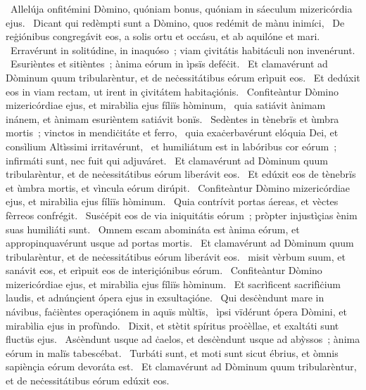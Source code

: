{~Allelúja}
{%
onfitémini Dòmino, quóniam bonus, quóniam in sáeculum mizericórdia ejus.
~Dicant qui redèmpti sunt a Dòmino, quos redémit de mànu inimíci,
~De reġiónibus congregávit eos, a solis ortu et occásu, et ab aquilóne et mari.
~Erravérunt in solitúdine, in inaquóso~; viam çivitátis habitáculi non invenérunt.
~Esurièntes et sitièntes~; ànima eórum in ìpsïs deféċit.
~Et clamavérunt ad Dòminum quum tribularèntur, et de neċessitátibus eórum erìpuit eos.
~Et dedúxit eos in viam rectam, ut irent in çivitátem habitaçiónis.
~Confiteàntur Dòmino mizericórdiae ejus, et mirabìlia ejus fíliïs hòminum,
~quia satiávit ànimam inánem, et ànimam esurièntem satiávit bonïs.
~Sedèntes in tènebrïs et ùmbra mortis~; vinctos in mendiċitáte et ferro,
~quia exaċerbavérunt elóquia Dei, et consìlium Altìssimi irritavérunt,
~et humiliátum est in labóribus cor eórum~; infirmáti sunt, nec fuit qui adjuváret.
~Et clamavérunt ad Dòminum quum tribularèntur, et de neċessitátibus eórum liberávit eos.
~Et edúxit eos de tènebrïs et ùmbra mortis, et vìncula eórum dirúpit.
~Confiteàntur Dòmino mizericórdiae ejus, et mirabìlia ejus fíliïs hòminum.
~Quia contrívit portas áereas, et vèctes fèrreos confrégit.
~Susċépit eos de via iniquitátis eórum~; pròpter injustìçias ènim suas humiliáti sunt.
~Omnem escam abomináta est ànima eórum, et appropinquavérunt usque ad portas mortis.
~Et clamavérunt ad Dòminum quum tribularèntur, et de neċessitátibus eórum liberávit eos.
~misit vèrbum suum, et sanávit eos, et erìpuit eos de interiçiónibus eórum.
~Confiteàntur Dòmino mizericórdiae ejus, et mirabìlia ejus fíliïs hòminum.
~Et sacrìficent sacrifìċium laudis, et adnúnçient ópera ejus in exsultaçióne.
~Qui desċèndunt mare in návibus, faċièntes operaçiónem in aquïs mùltïs,
~ìpsi vïdérunt ópera Dòmini, et mirabìlia ejus in profùndo.
~Dixit, et stètit spíritus proċèllae, et exaltáti sunt fluctüs ejus.
~Asċèndunt usque ad ċaelos, et desċèndunt usque ad abỳssos~; ànima eórum in malïs tabescébat.
~Turbáti sunt, et moti sunt sicut ébrius, et òmnis sapiènçia eórum devoráta est.
~Et clamavérunt ad Dòminum quum tribularèntur, et de neċessitátibus eórum edúxit eos.
}
